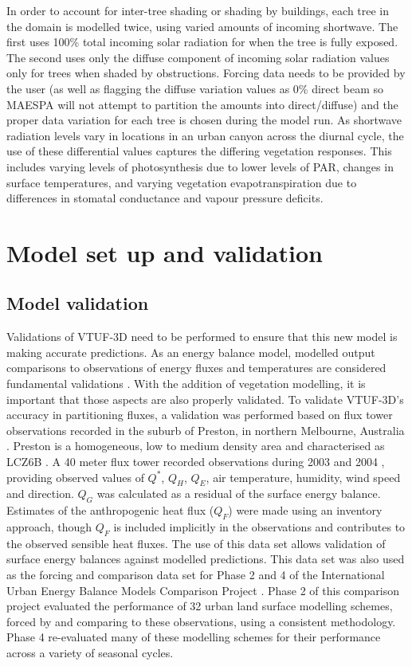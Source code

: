 \documentclass[final,3p,times,authoryear]{elsarticle}
\begin{document}
In order to account for inter-tree shading or shading by buildings, each tree in the domain is modelled twice, using varied amounts of incoming shortwave. The first uses 100\% total incoming solar radiation for when the tree is fully exposed. The second uses only the diffuse component of incoming solar radiation values only for trees when shaded by obstructions. Forcing data needs to be provided by the user (as well as flagging the diffuse variation values as 0\% direct beam so MAESPA will not attempt to partition the amounts into direct/diffuse) and the proper data variation for each tree is chosen during the model run. As shortwave radiation levels vary in locations in an urban canyon across the diurnal cycle, the use of these differential values captures the differing vegetation responses. This includes varying levels of photosynthesis due to lower levels of PAR, changes in surface temperatures, and varying vegetation evapotranspiration due to differences in stomatal conductance and vapour pressure deficits.

\section{Model set up and validation}
\subsection{Model validation}


Validations of VTUF-3D need to be performed to ensure that this new model is making accurate predictions. As an energy balance model, modelled output comparisons to observations of energy fluxes and temperatures are considered fundamental validations \citep{Masson2002a}. With the addition of vegetation modelling, it is important that those aspects are also properly validated. To validate VTUF-3D's accuracy in partitioning fluxes, a validation was performed based on flux tower observations recorded in the suburb of Preston, in northern Melbourne, Australia \citep{Coutts2007}. Preston is a homogeneous, low to medium density area and characterised as LCZ6B \citep{Stewart2012b}. A 40 meter flux tower recorded observations during 2003 and 2004 \citep{Coutts2007}, providing observed values of $Q^{*}$, $Q_{H}$, $Q_{E}$, air temperature, humidity, wind speed and direction. $Q_{G}$ was calculated as a residual of the surface energy balance. Estimates of the anthropogenic heat flux ($Q_{F}$) were made using an inventory approach, though $Q_{F}$ is included implicitly in the observations and contributes to the observed sensible heat fluxes. The use of this data set allows validation of surface energy balances against modelled predictions. This data set was also used as the forcing and comparison data set for Phase 2 and 4 of the International Urban Energy Balance Models Comparison Project \citep{Grimmond2011,Best2012}. Phase 2 of this comparison project evaluated the performance of 32 urban land surface modelling schemes, forced by and comparing to these observations, using a consistent methodology. Phase 4 re-evaluated many of these modelling schemes for their performance across a variety of seasonal cycles.
\end{document}
